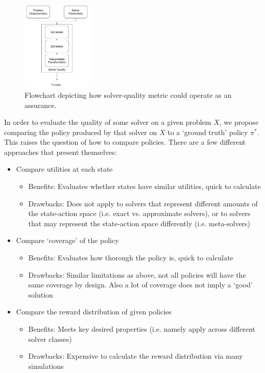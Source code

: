     \begin{figure}[htbp]
        \centering
        \includegraphics[width=0.3\textwidth]{Figures/SQ_EHM.pdf}
        \caption{Flowchart depicting how solver-quality metric could operate as an assurance.}
        \label{fig:SQ_flowchart}
    \end{figure}
    

    In order to evaluate the quality of some solver on a given problem $X$, we propose comparing the policy produced by that solver on $X$ to a `ground truth' policy $\pi^*$. This raises the question of how to compare policies. There are a few different approaches that present themselves:

    \begin{itemize}
        \item Compare utilities at each state
        \begin{itemize}
            \item Benefits: Evaluates whether states have similar utilities, quick to calculate
            \item Drawbacks: Does not apply to solvers that represent different amounts of the state-action space (i.e. exact vs. approximate solvers), or to solvers that may represent the state-action space differently (i.e. meta-solvers) 
        \end{itemize} 
        \item Compare `coverage' of the policy
        \begin{itemize}
            \item Benefits: Evaluates how thorough the policy is, quick to calculate
            \item Drawbacks: Similar limitations as above, not all policies will have the same coverage by design. Also a lot of coverage does not imply a `good' solution
        \end{itemize}
        \item Compare the reward distribution of given policies
        \begin{itemize}
            \item Benefits: Meets key desired properties (i.e. namely apply across different solver classes)
            \item Drawbacks: Expensive to calculate the reward distribution via many simulations
        \end{itemize}
    \end{itemize}

